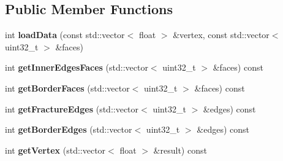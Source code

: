 \subsection*{Public Member Functions}
\begin{DoxyCompactItemize}
\item 
\mbox{\label{class_c_water_open_c_l_a40ad7bc6720195721f3129aa8c2739d4}} 
int {\bfseries load\+Data} (const std\+::vector$<$ float $>$ \&vertex, const std\+::vector$<$ uint32\+\_\+t $>$ \&faces)
\item 
\mbox{\label{class_c_water_open_c_l_a9e817028b963e53eba18e0c7591885e6}} 
int {\bfseries get\+Inner\+Edges\+Faces} (std\+::vector$<$ uint32\+\_\+t $>$ \&faces) const
\item 
\mbox{\label{class_c_water_open_c_l_ab2e33f7535616c17a9e93fd92a0664b2}} 
int {\bfseries get\+Border\+Faces} (std\+::vector$<$ uint32\+\_\+t $>$ \&faces) const
\item 
\mbox{\label{class_c_water_open_c_l_a9b09f2f3bd783f601ee34981bc26c112}} 
int {\bfseries get\+Fracture\+Edges} (std\+::vector$<$ uint32\+\_\+t $>$ \&edges) const
\item 
\mbox{\label{class_c_water_open_c_l_ab935c58d2c24c2739988d980cec389b8}} 
int {\bfseries get\+Border\+Edges} (std\+::vector$<$ uint32\+\_\+t $>$ \&edges) const
\item 
\mbox{\label{class_c_water_open_c_l_ac99522af5b8a9653beb5cdafc456d454}} 
int {\bfseries get\+Vertex} (std\+::vector$<$ float $>$ \&result) const
\end{DoxyCompactItemize}
